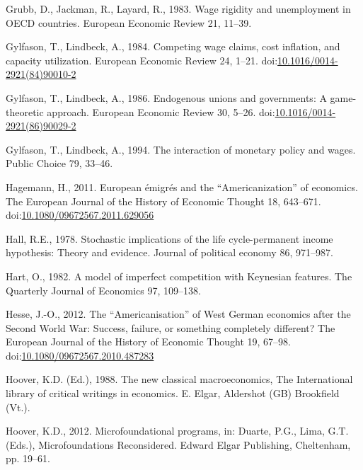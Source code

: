 \documentclass[
  12pt,
  onecolumn]{article}
\newlength{\cslhangindent}
\newlength{\cslentryspacingunit} %
\newenvironment{CSLReferences}[2] %
 {%
  \setlength{\parindent}{0pt}
  \ifodd #1
  \let\oldpar\par
  \def\par{\hangindent=\cslhangindent\oldpar}
  \fi
  \setlength{\parskip}{#2\cslentryspacingunit}
 }%
 {}
\begin{document}
\begin{CSLReferences}{1}{0}
\leavevmode{}%
Grubb, D., Jackman, R., Layard, R., 1983. Wage rigidity and unemployment
in {OECD} countries. European Economic Review 21, 11--39.

\leavevmode{}%
Gylfason, T., Lindbeck, A., 1984. Competing wage claims, cost inflation,
and capacity utilization. European Economic Review 24, 1--21.
doi:\href{https://doi.org/10.1016/0014-2921(84)90010-2}{10.1016/0014-2921(84)90010-2}

\leavevmode{}%
Gylfason, T., Lindbeck, A., 1986. Endogenous unions and governments: {A}
game-theoretic approach. European Economic Review 30, 5--26.
doi:\href{https://doi.org/10.1016/0014-2921(86)90029-2}{10.1016/0014-2921(86)90029-2}

\leavevmode{}%
Gylfason, T., Lindbeck, A., 1994. The interaction of monetary policy and
wages. Public Choice 79, 33--46.

\leavevmode{}%
Hagemann, H., 2011. European émigrés and the {``{Americanization}''} of
economics. The European Journal of the History of Economic Thought 18,
643--671.
doi:\href{https://doi.org/10.1080/09672567.2011.629056}{10.1080/09672567.2011.629056}

\leavevmode{}%
Hall, R.E., 1978. Stochastic implications of the life cycle-permanent
income hypothesis: Theory and evidence. Journal of political economy 86,
971--987.

\leavevmode{}%
Hart, O., 1982. A model of imperfect competition with {Keynesian}
features. The Quarterly Journal of Economics 97, 109--138.

\leavevmode{}%
Hesse, J.-O., 2012. The {``{Americanisation}''} of {West German}
economics after the {Second World War}: {Success}, failure, or something
completely different? The European Journal of the History of Economic
Thought 19, 67--98.
doi:\href{https://doi.org/10.1080/09672567.2010.487283}{10.1080/09672567.2010.487283}

\leavevmode{}%
Hoover, K.D. (Ed.), 1988. The new classical macroeconomics, The
{International} library of critical writings in economics. E. Elgar,
Aldershot (GB) Brookfield (Vt.).

\leavevmode{}%
Hoover, K.D., 2012. Microfoundational programs, in: Duarte, P.G., Lima,
G.T. (Eds.), Microfoundations {Reconsidered}. Edward Elgar Publishing,
Cheltenham, pp. 19--61.


\end{CSLReferences}
\end{document}
